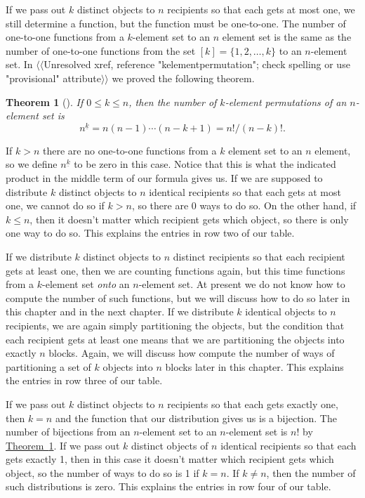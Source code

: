 \documentclass[10pt,]{book}
\theoremstyle{plain}
\newtheorem{theorem}{Theorem}[section]
\theoremstyle{definition}
\numberwithin{equation}{chapter}
\begin{document}
\par
If we pass out \(k\) distinct objects to \(n\) recipients so that each gets at most one, we still determine a function, but the function must be one-to-one. The number of one-to-one functions from a \(k\)-element set to an \(n\) element set is the same as the number of one-to-one functions from the set \([k] =\{1,2,\ldots,k\}\) to an \(n\)-element set. In {$\langle\langle$Unresolved xref, reference "kelementpermutation"; check spelling or use "provisional" attribute$\rangle\rangle$} we proved the following theorem.%
\begin{theorem}[{}]\label{numberofinjections}
If \(0\le k\le n\), then the number of \(k\)-element permutations of an \(n\)-element set is%
\begin{equation*}
n^{\underline{k}} = n(n-1)\cdots(n-k+1) =
n!/(n-k)!.
\end{equation*}
%
\par
{}%
\end{theorem}
If \(k>n\) there are no one-to-one functions from a \(k\) element set to an \(n\) element, so we define \(n^{\underline{k}}\) to be zero in this case. Notice that this is what the indicated product in the middle term of our formula gives us. If we are supposed to distribute \(k\) distinct objects to \(n\) identical recipients so that each gets at most one, we cannot do so if \(k>n\), so there are 0 ways to do so. On the other hand, if \(k\le n\), then it doesn't matter which recipient gets which object, so there is only one way to do so. This explains the entries in row two of our table.%
\par
If we distribute \(k\) distinct objects to \(n\) distinct recipients so that each recipient gets at least one, then we are counting functions again, but this time functions from a \(k\)-element set \emph{onto} an \(n\)-element set. At present we do not know how to compute the number of such functions, but we will discuss how to do so later in this chapter and in the next chapter. If we distribute \(k\) identical objects to \(n\) recipients, we are again simply partitioning the objects, but the condition that each recipient gets at least one means that we are partitioning the objects into exactly \(n\) blocks. Again, we will discuss how compute the number of ways of partitioning a set of \(k\) objects into \(n\) blocks later in this chapter. This explains the entries in row three of our table.%
\par
If we pass out \(k\) distinct objects to \(n\) recipients so that each gets exactly one, then \(k=n\) and the function that our distribution gives us is a bijection. The number of bijections from an \(n\)-element set to an \(n\)-element set is \(n!\) by \hyperref[numberofinjections]{Theorem~\ref{numberofinjections}}. If we pass out \(k\) distinct objects of \(n\) identical recipients so that each gets exactly 1, then in this case it doesn't matter which recipient gets which object, so the number of ways to do so is 1 if \(k=n\). If \(k\not=n\), then the number of such distributions is zero. This explains the entries in row four of our table.%
\end{document}
